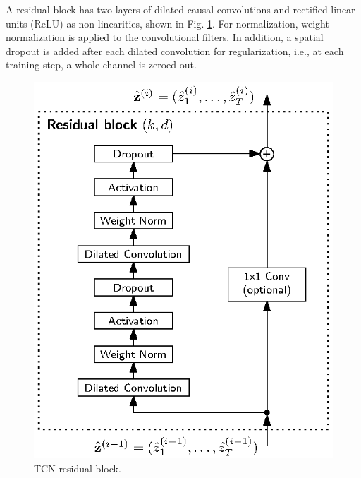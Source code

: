 \documentclass{scrartcl}
\begin{document}
A residual block has two layers of dilated causal convolutions and rectified linear units (ReLU) as non-linearities, shown in Fig. \ref{fig:residual_block}. For normalization, weight normalization \cite{Salimans2016} is applied to the convolutional filters. In addition, a spatial dropout \cite{Srivastava2014} is added after each dilated convolution for regularization, i.e., at each training step, a whole channel is zeroed out.
\begin{figure}[htbp]
\centering
\includegraphics[scale=1]{figures/residual_block.eps}
\caption{TCN residual block.}
\label{fig:residual_block} 
\end{figure}
\end{document}
